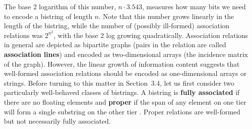 \bigskip
The base 2 logarithm of this number, $n \cdot 3.543$, measures how many bits
we need to encode a bistring of length $n$. Note that this number grows
linearly in the length of the bistring, while the number of (possibly
ill-formed) association relations was $2^{n^2}$, with the base 2 log growing
quadratically. Association relations in general are depicted as bipartite
graphs (pairs in the relation are called {\bf association
  lines}) and encoded as two-dimensional arrays (the
incidence matrix of the graph). However, the linear growth of information
content suggests that well-formed association relations should be encoded as
one-dimensional arrays or strings. Before turning to this matter in
Section~3.4, let us first consider two particularly well-behaved classes of
bistrings. A bistring is {\bf fully associated} if there are no floating
elements and {\bf proper} if the span of any element on one tier will form a
single substring on the other tier \cite{Levin:1985}.  Proper relations are
well-formed but not necessarily fully associated.  
 

